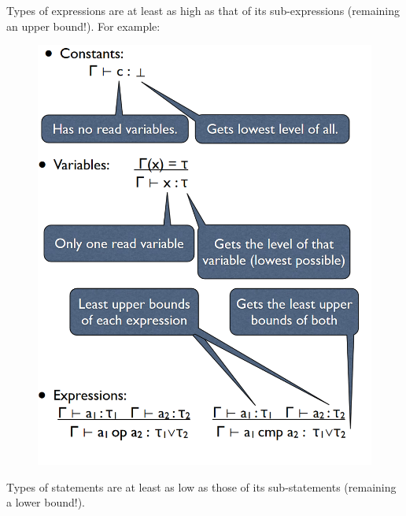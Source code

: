 \documentclass[10pt,a4paper]{report}
\begin{document}
\clearpage
Types of expressions are at least as high as that of its sub-expressions (remaining an upper bound!). For example:
\begin{figure}[H]
\centering
\includegraphics[scale=0.4]{22.png}
\end{figure}
\clearpage
Types of statements are at least as low as those of its sub-statements (remaining a lower bound!).
\end{document}
